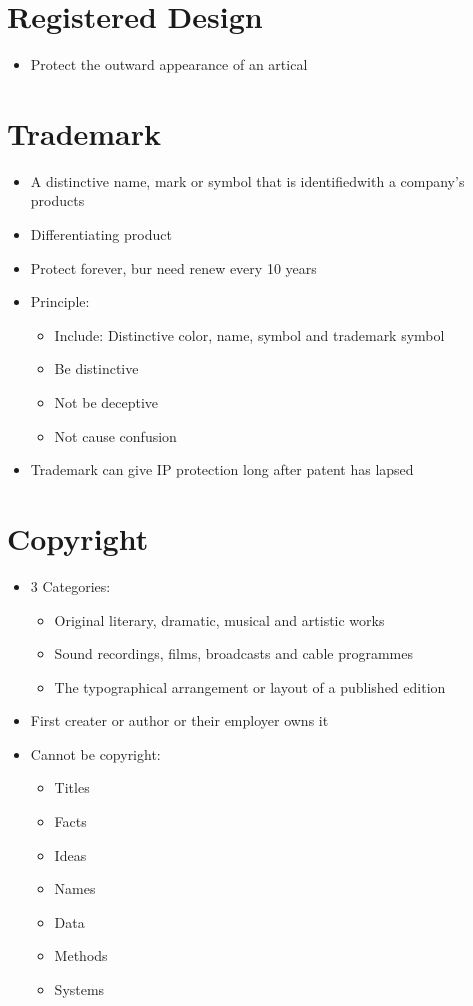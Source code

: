 \documentclass[openany,12pt,a4paper]{book}
\begin{document}
\section{Registered Design}
\begin{itemize}
    \item Protect the outward appearance of an artical
\end{itemize}
\section{Trademark}
\begin{itemize}
    \item A distinctive name, mark or symbol that is identifiedwith a company's products
    \item Differentiating product
    \item Protect forever, bur need renew every 10 years
    \item Principle:
    \begin{itemize}
        \item Include: Distinctive color, name, symbol and trademark symbol
        \item Be distinctive
        \item Not be deceptive
        \item Not cause confusion
    \end{itemize}
    \item Trademark can give IP protection long after patent has lapsed
\end{itemize}
\section{Copyright}
\begin{itemize}
    \item 3 Categories:
    \begin{itemize}
        \item Original literary, dramatic, musical and artistic works
        \item Sound recordings, films, broadcasts and cable programmes
        \item The typographical arrangement or layout of a published edition
    \end{itemize}
    \item First creater or author or their employer owns it
    \item Cannot be copyright:
    \begin{itemize}
        \item Titles
        \item Facts
        \item Ideas
        \item Names
        \item Data
        \item Methods
        \item Systems
    \end{itemize}
\end{itemize}
\end{document}
